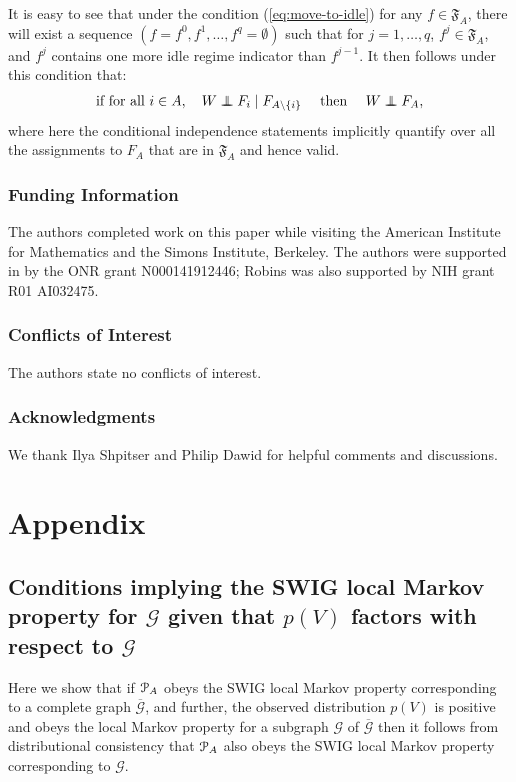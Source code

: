 \documentclass[11pt]{article}
\newcommand{\G}{{\mathscr G}}
\newcommand\indep{\protect\mathpalette{\protect\independenT}{\perp}}
\def\independenT#1#2{\mathrel{\rlap{$#1#2$}\mkern2.5mu{#1#2}}}
\begin{document}
{It is easy to see that under the condition (\ref{eq:move-to-idle}) for any $f\in  \mathfrak{F}_A$, there will exist a sequence $(f=f^0,f^1,\ldots ,f^q=\emptyset)$ such that for $j=1,\ldots , q$, $f^j \in \mathfrak{F}_A$, and $f^{j}$ contains one more idle regime indicator than $f^{j-1}$. It then follows under this condition that:
\begin{align}
\hbox{if for all } i\in A,\quad W \indep F_i \mid F_{A\setminus \{i\}}\quad \hbox{ then } \quad W \indep  F_{A},
\end{align}
where here the conditional independence statements implicitly quantify over all the assignments to $F_A$ that are in $\mathfrak{F}_A$ and hence valid.

\eject

\subsubsection*{Funding Information} The authors completed work on this paper while visiting
the American Institute for Mathematics and the Simons Institute, Berkeley.
The authors were supported in by the ONR grant N000141912446; Robins was also supported by
NIH grant R01 AI032475.


\subsubsection*{Conflicts of Interest}  The authors state no conflicts of interest.
 
 
\subsubsection*{Acknowledgments} We thank Ilya Shpitser and Philip Dawid for helpful comments and discussions.
 
 



\appendix

\section{Appendix}

\subsection{Conditions implying the SWIG local Markov property for $\G$ given that $p(V)$ factors with respect to $\G$
 }\label{app:dawid-swig}
 

Here we show that if ${\cal P}_A$ obeys the SWIG local Markov property corresponding to a complete graph $\overline{\G}$,  and further,  the observed distribution   
$p(V)$ is positive and obeys the local Markov property for a subgraph $\G$ of $\overline{\G}$ then it follows from distributional consistency that ${\cal P}_A$ also obeys the SWIG local Markov property corresponding to ${\G}$.

}
\end{document}
